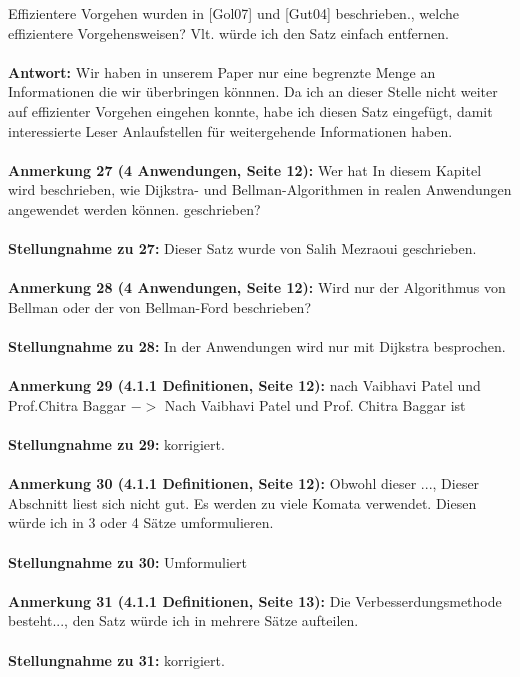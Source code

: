 \documentclass[a4paper,12pt]{book}
\begin{document}
\glqq Effizientere Vorgehen wurden in [Gol07] und [Gut04] beschrieben.\grqq, welche effizientere Vorgehensweisen? Vlt. würde ich den Satz einfach entfernen. 
\\ \\
\textbf{Antwort:}
Wir haben in unserem Paper nur eine begrenzte Menge an Informationen die wir überbringen könnnen. Da ich an dieser Stelle nicht weiter auf effizienter Vorgehen eingehen konnte, habe ich diesen Satz eingefügt, damit interessierte Leser Anlaufstellen für weitergehende Informationen haben.
\\ \\
\textbf{Anmerkung 27 (4 Anwendungen, Seite 12):}
Wer hat \glqq In diesem Kapitel wird beschrieben, wie Dijkstra- und Bellman-Algorithmen in realen Anwendungen angewendet werden können.\grqq{} geschrieben? 
 \\  \\
\textbf{Stellungnahme zu 27:} Dieser Satz wurde von Salih Mezraoui geschrieben.
\\ \\
\textbf{Anmerkung 28 (4 Anwendungen, Seite 12):}
Wird nur der Algorithmus von Bellman oder der von Bellman-Ford beschrieben?
 \\  \\
\textbf{Stellungnahme zu 28:} In der Anwendungen wird nur mit Dijkstra besprochen.
\\ \\
\textbf{Anmerkung 29 (4.1.1 Definitionen, Seite 12):}
nach Vaibhavi Patel und Prof.Chitra Baggar $->$ Nach Vaibhavi Patel und Prof. Chitra Baggar ist
 \\  \\
\textbf{Stellungnahme zu 29:} korrigiert.
\\ \\
\textbf{Anmerkung 30 (4.1.1 Definitionen, Seite 12):}
\glqq Obwohl dieser ...\grqq, Dieser Abschnitt liest sich nicht gut. Es werden zu viele Komata verwendet. Diesen würde ich in 3 oder 4 Sätze umformulieren.   
\\  \\
\textbf{Stellungnahme zu 30:} Umformuliert
\\ \\
\textbf{Anmerkung 31 (4.1.1 Definitionen, Seite 13):}
\glqq Die Verbesserdungsmethode besteht...\grqq, den Satz würde ich in mehrere Sätze aufteilen. 
 \\  \\
\textbf{Stellungnahme zu 31:} korrigiert.
\\ \\
\end{document}
